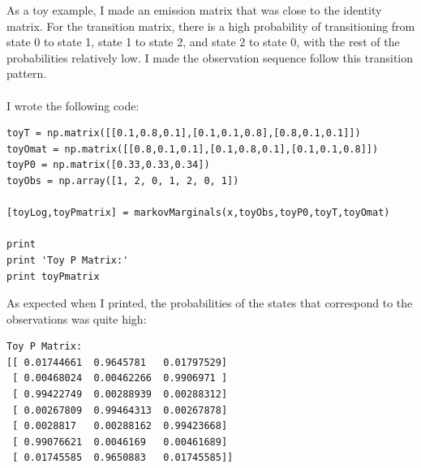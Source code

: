 \documentclass[twoside,11pt]{article}
\theoremstyle{definition}
\begin{document}
As a toy example, I made an emission matrix that was close to the identity matrix. For the transition matrix, there is a high probability of transitioning from state 0 to state 1, state 1 to state 2, and state 2 to state 0, with the rest of the probabilities relatively low. I made the observation sequence follow this transition pattern.\\
\\
I wrote the following code:
\begin{lstlisting}
toyT = np.matrix([[0.1,0.8,0.1],[0.1,0.1,0.8],[0.8,0.1,0.1]])
toyOmat = np.matrix([[0.8,0.1,0.1],[0.1,0.8,0.1],[0.1,0.1,0.8]])
toyP0 = np.matrix([0.33,0.33,0.34])
toyObs = np.array([1, 2, 0, 1, 2, 0, 1])

[toyLog,toyPmatrix] = markovMarginals(x,toyObs,toyP0,toyT,toyOmat)

print
print 'Toy P Matrix:'
print toyPmatrix
\end{lstlisting}

As expected when I printed, the probabilities of the states that correspond to the observations was quite high:
\begin{lstlisting}
Toy P Matrix:
[[ 0.01744661  0.9645781   0.01797529]
 [ 0.00468024  0.00462266  0.9906971 ]
 [ 0.99422749  0.00288939  0.00288312]
 [ 0.00267809  0.99464313  0.00267878]
 [ 0.0028817   0.00288162  0.99423668]
 [ 0.99076621  0.0046169   0.00461689]
 [ 0.01745585  0.9650883   0.01745585]]
\end{lstlisting}
\end{document}
